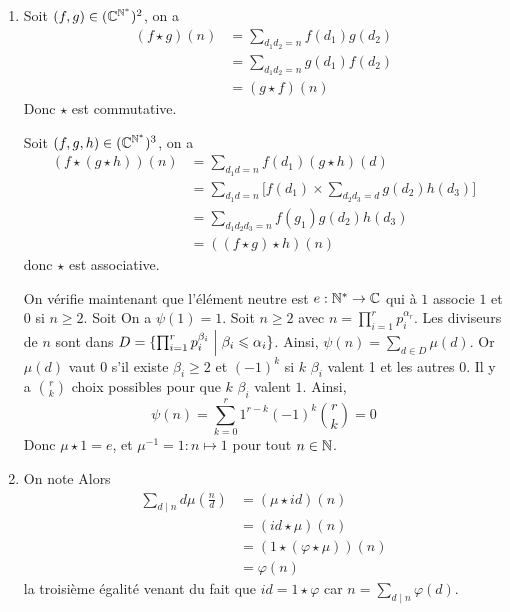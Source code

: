 \begin{solution}
\begin{enumerate}
		\item Soit $(f,g)\in(\mathbb{C}^{\mathbb{N}^{*}})^{2}$, on a 
		\begin{align*}
			(f\star g)(n)
			&=\sum_{d_{1}d_{2}=n}f(d_{1})g(d_{2})\\
			&=\sum_{d_{1}d_{2}=n}g(d_{1})f(d_{2})\\
			&=(g\star f)(n)
		\end{align*}
		Donc $\star$ est commutative. 

		Soit $(f,g,h)\in(\mathbb{C}^{\mathbb{N}^{*}})^{3}$, on a 
		\begin{align*}
			(f\star (g\star h))(n)
			&=\sum_{d_{1}d=n}f(d_{1})(g\star h)(d)\\
			&=\sum_{d_{1}d=n}\Biggl[f(d_{1})\times \sum_{d_{2}d_{3}=d}g(d_{2})h(d_{3})\Biggr]\\
			&=\sum_{d_{1}d_{2}d_{3}=n}f(g_{1})g(d_{2})h(d_{3})\\
			&=((f\star g)\star h)(n)
		\end{align*}
		donc $\star$ est associative. 

		On vérifie maintenant que l'élément neutre est $e:\mathbb{N}^{*}\to\mathbb{C}$ qui à $1$ associe $1$ et 0 si $n\geqslant2$.
		Soit 
		On a $\psi(1)=1$. Soit $n\geqslant2$ avec $n=\prod_{i=1}^{r}p_{i}^{\alpha_{r}}$. Les diviseurs de $n$ sont dans $D=\{\prod_{i=1}^{r}p_{i}^{\beta_{i}}\Bigm| \beta_{i}\leqslant\alpha_{i}\}$. Ainsi, $\psi(n)=\sum_{d\in D}\mu(d)$. Or $\mu(d)$ vaut 0 s'il existe $\beta_{i}\geqslant2$ et $(-1)^{k}$ si $k$ $\beta_{i}$ valent 1 et les autres 0. Il y a $\binom{r}{k}$ choix possibles pour que $k$ $\beta_{i}$ valent $1$. Ainsi,
		$$\psi(n)=\sum_{k=0}^{r}1^{r-k}(-1)^{k}\binom{r}{k}=0$$
		Donc $\mu\star 1=e$, et $\mu^{-1}=1\colon n\mapsto 1$ pour tout $n\in\mathbb{N}$.

		\item On note 
		Alors 
		\begin{align*}
			\sum_{d\mid n}d\mu(\frac{n}{d})
			&=(\mu\star id)(n)\\
			&=(id\star \mu)(n)\\
			&=(1\star (\varphi\star \mu))(n)\\
			&=\varphi(n)
		\end{align*}
		la troisième égalité venant du fait que $id=1\star\varphi$ car $n=\sum_{d\mid n}\varphi(d)$.
	\end{enumerate}
\end{solution}

